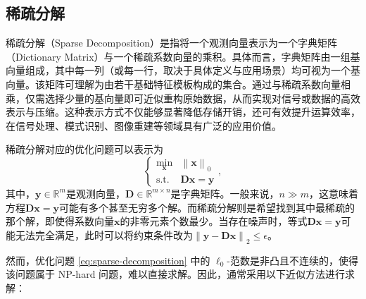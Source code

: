 \subsection{稀疏分解}
稀疏分解（Sparse Decomposition）是指将一个观测向量表示为一个字典矩阵（Dictionary Matrix）与一个稀疏系数向量的乘积。具体而言，字典矩阵由一组基向量组成，其中每一列（或每一行，取决于具体定义与应用场景）均可视为一个基向量。该矩阵可理解为由若干基础特征模板构成的集合。通过与稀疏系数向量相乘，仅需选择少量的基向量即可近似重构原始数据，从而实现对信号或数据的高效表示与压缩。这种表示方式不仅能够显著降低存储开销，还可有效提升运算效率，在信号处理、模式识别、图像重建等领域具有广泛的应用价值。

稀疏分解对应的优化问题可以表示为
\begin{equation}
    \begin{cases}
        \min_{\bm{x}} & \left\| \bm{x} \right\|_0  \\
        \text{s.t.}   & \mathbf{D} \bm{x} = \bm{y}
    \end{cases},
    \label{eq:sparse-decomposition}
\end{equation}
其中，\( \bm{y} \in \mathbb{R}^m \)是观测向量，\( \mathbf{D} \in \mathbb{R}^{m \times n} \)是字典矩阵。一般来说，\( n \gg m \)，这意味着方程\( \mathbf{D} \bm{x} = \bm{y} \)可能有多个甚至无穷多个解。而稀疏分解则是希望找到其中最稀疏的那个解，即使得系数向量\( \bm{x} \)的非零元素个数最少。当存在噪声时，等式\( \mathbf{D} \bm{x} = \bm{y} \)可能无法完全满足，此时可以将约束条件改为\( \left\| \bm{y} - \mathbf{D} \bm{x} \right\|_2 \leq \epsilon \)。

然而，优化问题 \cref{eq:sparse-decomposition} 中的 \( \ell_0 \)-范数是非凸且不连续的，使得该问题属于 NP-hard 问题，难以直接求解。因此，通常采用以下近似方法进行求解：

